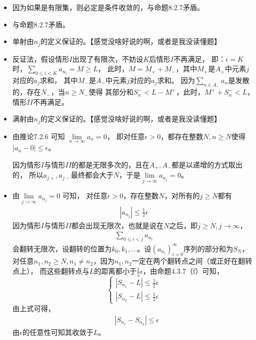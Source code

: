 \documentclass{article}
\begin{document}
\begin{itemize}
  \item 因为如果是有限集，则必定是条件收敛的，与命题8.2.7矛盾。
  \item 与命题8.2.7矛盾。
  \item 单射由$n_j$的定义保证的。【感觉没啥好说的啊，或者是我没读懂题】
  \item 反证法，假设情形$I$出现了有限次，不妨设$K$后情形$I$不再满足，
        即：$i = K$时，$\sum \limits_{0 \leq i < K} a_{n_i} = M \geq L$，
        此时，$M = M_{+} + M_{-}$，其中$M_{+}$是$A_{+}$中元素$j$对应的$a_j$求和，
        其中$M_{-}$是$A_{-}$中元素$j$对应的$a_j$求和。
        因为$\sum \limits_{n \in A_{-}} a_{n}$是发散的，存在$N_{-}$，当$n \geq N_{-}$使得
        其部分和$S_{n}^{-} < L - M^{+}$，此时，$M^{+} + S_{n}^{-} < L$，情形$II$不再满足。
  \item 满射由$n_j$的定义保证的。【感觉没啥好说的啊，或者是我没读懂题】
  \item 由推论7.2.6 可知 $\lim \limits_{n \rightarrow \infty} a_n = 0$，
        即对任意$\epsilon > 0$，都存在整数$N, n \geq N$使得$|a_n - 0| \leq \epsilon$。

        因为情形$I$与情形$II$的都是无限多次的，且在$A_{+},A_{-}$都是以递增的方式取出的，
        所以$a_{j+}, a_{j-}$最终都会大于$N$，于是$\lim \limits_{j \rightarrow \infty} a_{n_j} = 0$。
  \item 由$\lim \limits_{j \rightarrow \infty} a_{n_j} = 0$ 可知，
        对任意$\epsilon > 0$，存在整数$N$，对所有的$j \geq N$都有
        \begin{align*}
          |a_{n_j}| \leq \frac{1}{2} \epsilon
        \end{align*}
        因为情形$I$与情形$II$都会出现无限次，也就是说在$N$之后，即$j \geq N, j \rightarrow \infty$，
        \begin{align*}
          \sum \limits_{0 \leq i < j} a_{n_i}
        \end{align*}
        会翻转无限次，设翻转的位置为$k_0,k_1,...$。设$(a_{n_i})_{i=0}^\infty$序列的部分和为$S_N$，
        对任意$n_1, n_2 \geq N, n_1 \neq n_2$，因为$n_1, n_2$一定在两个翻转点之间（或正好在翻转点上），
        而这些翻转点与$L$的距离都小于$\frac{1}{2}\epsilon$，由命题4.3.7（f）可知，
        \begin{equation*}
          \begin{cases*}
            |S_{n_1} - L| \leq \frac{1}{2} \epsilon \\
            |S_{n_2} - L| \leq \frac{1}{2} \epsilon
          \end{cases*}
        \end{equation*}
        由上式可得，
        \begin{align*}
           & |S_{n_1} - S_{n_2}| \leq \epsilon
        \end{align*}
        由$\epsilon$的任意性可知其收敛于$L$。
\end{itemize}
\end{document}
